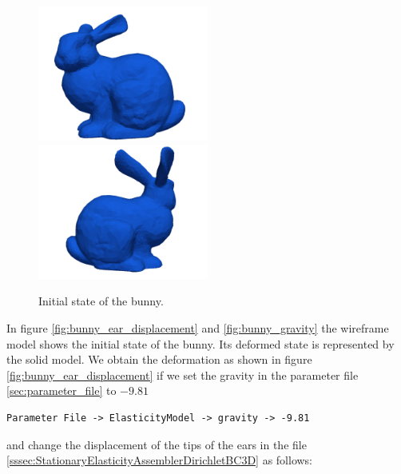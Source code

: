 \documentclass[a4paper, 11pt, twoside]{article}
\theoremstyle{plain}
\theoremstyle{definition}
\begin{document}
\begin{figure}[htb]
\centering
\includegraphics[width=0.5\textwidth]{bunny_initial_front.png}
\includegraphics[width=0.5\textwidth]{bunny_initial_back.png}
\caption{Initial state of the bunny.}
\label{fig:bunny_initial}
\end{figure}

In figure \ref{fig:bunny_ear_displacement} and \ref{fig:bunny_gravity} the wireframe model shows the initial state of the bunny. 
Its deformed state is represented by the solid model.
We obtain the deformation as shown in figure \ref{fig:bunny_ear_displacement} if we set the gravity in the parameter file \ref{sec:parameter_file} to $-9.81$
\begin{lstlisting}[breaklines]
  Parameter File -> ElasticityModel -> gravity -> -9.81
\end{lstlisting}
and change the displacement of the tips of the ears in the file \ref{sssec:StationaryElasticityAssemblerDirichletBC3D} as follows:

\end{document}
